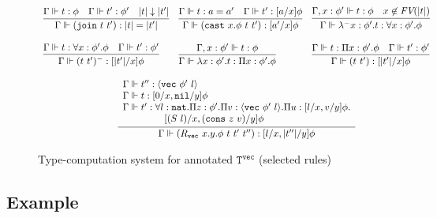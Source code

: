 \documentclass[copyright]{eptcs}
\newcommand{\vc}[0]{\texttt{vec}}
\newcommand{\nat}[0]{\texttt{nat}}
\newcommand{\Tvec}[0]{\texttt{T}^\vc}
\newcommand{\nil}[0]{\texttt{nil}}
\newcommand{\cons}[0]{\texttt{cons}}
\newcommand{\join}[0]{\texttt{join}}
\newcommand{\cast}[0]{\texttt{cast}}
\newcommand{\drop}[1]{| #1 |}
\begin{document}
\begin{figure}
\[
\begin{array}{lll}
\infer{\Gamma\Vdash (\join\ t\ t') : \drop{t} = \drop{t'}}{\Gamma \Vdash t:\phi &  \Gamma \Vdash t':\phi' & \drop{t} \downarrow \drop{t'}}
&
\infer{\Gamma\Vdash (\cast\ x.\phi\ t\ t'):[a'/x]\phi}{\Gamma \Vdash t: a = a' & \Gamma \Vdash t':[a/x]\phi} 
&
\infer{\Gamma \Vdash \lambda^- x:\phi'.t : \forall x:\phi'.\phi}{\Gamma, x:\phi' \Vdash t:\phi & x\not\in\textit{FV}(\drop{t})}
\\ \\
\infer{\Gamma \Vdash (t\ t')^- : [\drop{t'}/x]\phi}{\Gamma \Vdash t:\forall x:\phi'.\phi & \Gamma \Vdash t':\phi'}
&

\infer{\Gamma \Vdash \lambda x:\phi'. t : \Pi x:\phi'.\phi}
      {\Gamma, x:\phi' \Vdash t:\phi}
&
\infer{\Gamma \Vdash (t\ t') : [\drop{t'}/x]\phi}{\Gamma \Vdash t:\Pi x:\phi'.\phi & \Gamma\Vdash t':\phi'}

\\ \\
\multicolumn{3}{c}{\infer{\Gamma\Vdash (R_\vc\ x.y.\phi\ t\ t'\ t''):[l/x, \drop{t''}/y]\phi}
      {\begin{array}{l}\Gamma \Vdash t'' : \langle \vc\ \phi'\ l\rangle \\
       \Gamma \Vdash t : [0/x,\nil/y]\phi \\
       \Gamma \Vdash t' : \forall l:\nat. \Pi z:\phi'. \Pi v :\langle \vc\ \phi'\ l\rangle. \Pi u : [l/x, v/y]\phi. \\
        \ \ \ \ \ \ \ \ \ \ \ \ \  [(S\ l)/x, (\cons\ z\ v)/y]\phi
       \end{array}}}
\end{array}
\]
\caption{Type-computation system for annotated $\Tvec$ (selected rules)}
\label{fig:tpcomp}
\end{figure}

\subsection{Example}
\label{sec:eg}
\end{document}
